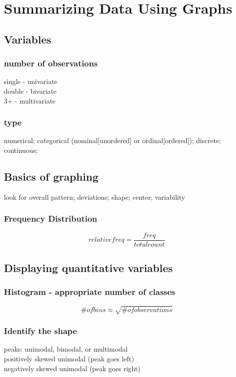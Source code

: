 \chapter{Summarizing Data Using Graphs}  %

\section{Variables}  %
\subsection{number of observations}  %
single - univariate \\
double - bivariate \\
3+ - multivariate
\subsection{type}  %
numerical; categorical (nominal[unordered] or ordinal[ordered]); discrete; continuous;

\section{Basics of graphing}  %
look for overall pattern; deviations; shape; center; variability

\subsection{Frequency Distribution}  %
\begin{equation}
    relative freq = \frac{freq}{total count}
\end{equation}


\section{Displaying quantitative variables}  %
\subsection{Histogram - appropriate number of classes}  %
\[
    \# of bins \approx \sqrt{\# of observations}
\]
\subsection{Identify the shape}  %
peaks: unimodal, bimodal, or multimodal\\
positively skewed unimodal (peak goes left)\\
negatively skewed unimodal (peak goes right)
